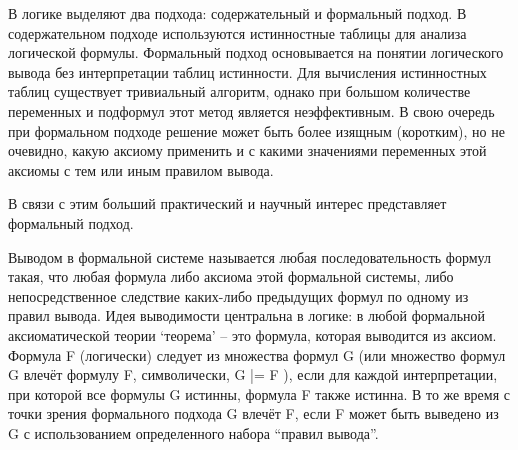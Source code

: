 В логике выделяют два подхода: содержательный и формальный подход. В содержательном подходе используются истинностные таблицы для анализа логической формулы. Формальный подход основывается на понятии логического вывода без интерпретации таблиц истинности. Для вычисления истинностных таблиц существует тривиальный алгоритм, однако при большом количестве переменных и подформул этот метод является неэффективным. В свою очередь при формальном подходе решение может быть более изящным (коротким), но не очевидно, какую аксиому применить и с какими значениями переменных этой аксиомы с тем или иным правилом вывода.

В связи с этим больший практический и научный интерес представляет формальный подход.

Выводом в формальной системе называется любая последовательность формул такая, что любая формула либо аксиома этой формальной системы, либо непосредственное следствие каких-либо предыдущих формул по одному из правил вывода.
Идея выводимости центральна в логике: в любой формальной аксиоматической теории `теорема' – это формула, которая выводится из аксиом.
Формула F (логически) следует из множества формул G (или множество формул G влечёт формулу F, символически, G |= F ), если для каждой интерпретации, при которой все формулы G истинны, формула F также истинна. В то же время с точки зрения формального подхода G влечёт F, если F может быть выведено из G с использованием определенного набора ``правил вывода''.

